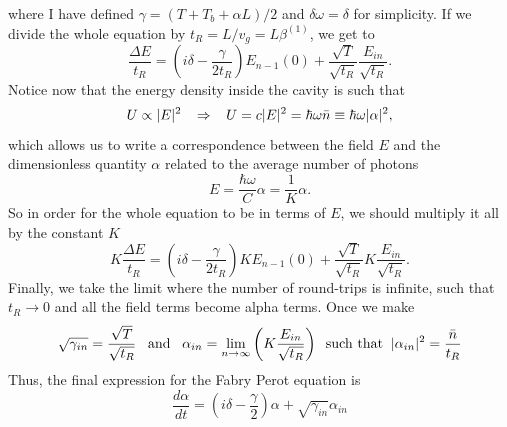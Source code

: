 where I have defined $\gamma=(T+T_b+\alpha L)/2$ and $\delta\omega=\delta$ for simplicity. If we divide the whole equation by $t_R=L/v_g=L\beta^{(1)}$, we get to
\begin{equation}
    \frac{\Delta E}{t_R}=\left(i\delta-\frac{\gamma}{2t_R}\right)E_{n-1}(0)+\frac{\sqrt{T}}{\sqrt{t_R}}\frac{E_{in}}{\sqrt{t_R}}.
\end{equation}
Notice now that the energy density inside the cavity is such that
\begin{equation}
    U\propto |E|^2\;\;\;\Rightarrow\;\;\;U=c|E|^2=\hbar\omega\Bar{n}\equiv\hbar\omega|\alpha|^2,
\end{equation}
which allows us to write a correspondence between the field $E$ and the dimensionless quantity $\alpha$ related to the average number of photons
\begin{equation}
    E=\frac{\hbar\omega}{C}\alpha=\frac{1}{K}\alpha.
\end{equation}
So in order for the whole equation to be in terms of $E$, we should multiply it all by the constant $K$
\begin{equation}
    K\frac{\Delta E}{t_R}=\left(i\delta-\frac{\gamma}{2t_R}\right)KE_{n-1}(0)+\frac{\sqrt{T}}{\sqrt{t_R}}K\frac{E_{in}}{\sqrt{t_R}}.
\end{equation}
Finally, we take the limit where the number of round-trips is infinite, such that $t_R\rightarrow 0$ and all the field terms become alpha terms. Once we make
\begin{equation}
    \sqrt{\gamma_{in}}=\frac{\sqrt{T}}{\sqrt{t_R}}\;\;\;\text{and}\;\;\;\alpha_{in}=\lim_{n\rightarrow\infty}\left(K\frac{E_{in}}{\sqrt{t_R}}\right)\;\;\text{such that}\;\;|\alpha_{in}|^2=\frac{\Bar{n}}{t_R}
\end{equation}
Thus, the final expression for the Fabry Perot equation is
\begin{equation}
    \boxed{\frac{d\alpha}{dt}=\left(i\delta-\frac{\gamma}{2}\right)\alpha+\sqrt{\gamma_{in}}\alpha_{in}}
    \label{eq:final.fabry.perot}
\end{equation}

